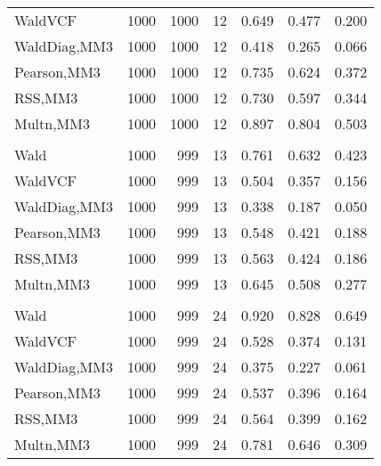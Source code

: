 \documentclass[
]{article}
\begin{document}
\begin{table}[H]
{\begin{tabular}[t]{lrrrrrr}
\hspace{1em}WaldVCF & 1000 & 1000 & 12 & 0.649 & 0.477 & 0.200\\
\hspace{1em}WaldDiag,MM3 & 1000 & 1000 & 12 & 0.418 & 0.265 & 0.066\\
\hspace{1em}Pearson,MM3 & 1000 & 1000 & 12 & 0.735 & 0.624 & 0.372\\
\hspace{1em}RSS,MM3 & 1000 & 1000 & 12 & 0.730 & 0.597 & 0.344\\
\hspace{1em}Multn,MM3 & 1000 & 1000 & 12 & 0.897 & 0.804 & 0.503\\
\addlinespace[0.3em]
\multicolumn{7}{l}{\textbf{2F 10V}}\\
\hspace{1em}Wald & 1000 & 999 & 13 & 0.761 & 0.632 & 0.423\\
\hspace{1em}WaldVCF & 1000 & 999 & 13 & 0.504 & 0.357 & 0.156\\
\hspace{1em}WaldDiag,MM3 & 1000 & 999 & 13 & 0.338 & 0.187 & 0.050\\
\hspace{1em}Pearson,MM3 & 1000 & 999 & 13 & 0.548 & 0.421 & 0.188\\
\hspace{1em}RSS,MM3 & 1000 & 999 & 13 & 0.563 & 0.424 & 0.186\\
\hspace{1em}Multn,MM3 & 1000 & 999 & 13 & 0.645 & 0.508 & 0.277\\
\addlinespace[0.3em]
\multicolumn{7}{l}{\textbf{3F 15V}}\\
\hspace{1em}Wald & 1000 & 999 & 24 & 0.920 & 0.828 & 0.649\\
\hspace{1em}WaldVCF & 1000 & 999 & 24 & 0.528 & 0.374 & 0.131\\
\hspace{1em}WaldDiag,MM3 & 1000 & 999 & 24 & 0.375 & 0.227 & 0.061\\
\hspace{1em}Pearson,MM3 & 1000 & 999 & 24 & 0.537 & 0.396 & 0.164\\
\hspace{1em}RSS,MM3 & 1000 & 999 & 24 & 0.564 & 0.399 & 0.162\\
\hspace{1em}Multn,MM3 & 1000 & 999 & 24 & 0.781 & 0.646 & 0.309\\
\bottomrule
\end{tabular}}
\endgroup{}
\end{table}
\end{document}
